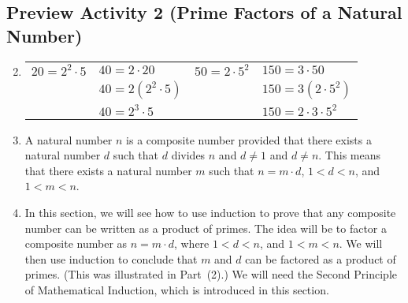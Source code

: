 \subsection*{Preview Activity 2 (Prime Factors of a Natural Number)}
\begin{enumerate}
\setcounter{enumi}{1}
\item 
\begin{tabular}[t]{p{1in} p{2in} p{1in} p{2in}}
$20 = 2^2 \cdot 5$ &  $40 = 2 \cdot 20$  & $50 = 2 \cdot 5^2$ & $150 = 3 \cdot 50$ \\
                   &  $40 = 2 ( {2^2 \cdot 5} )$  &  & $150 = 3 ( {2 \cdot 5^2} )$ \\
                   &  $40 = 2^3 \cdot 5$  &  & $150 = 2 \cdot 3 \cdot 5^2$ \\
\end{tabular}


\addtocounter{enumi}{1}
\item A natural number  $n$  is a composite number provided that there exists a natural number  
$d$  such that  $d$  divides  $n$  and  $d \ne 1$  and  $d \ne n$.  This means that there exists a natural number  $m$  such that  $n = m \cdot d$, $1 < d < n$, and  $1 < m < n$.

\item In this section, we will see how to use induction to prove that any composite number can be written as a product of primes.  The idea will be to factor a composite number as  
$n = m \cdot d$,  where  $1 < d < n$, and  $1 < m < n$.  We will then use induction to conclude that  $m$  and  $d$  can be factored as a product of primes.  (This was illustrated in 
Part~(2).)  We will need the Second Principle of Mathematical Induction, which is introduced in this section.
\end{enumerate}
\hbreak




\newpage

\endinput
